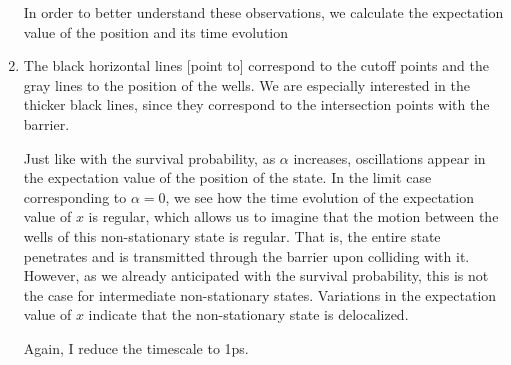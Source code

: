 \documentclass[12pt, a4paper]{article}
\begin{document}
\begin{enumerate}[label=\textbf{Slide \arabic*.}]
        In order to better understand these observations, we calculate the expectation value of the position and its time evolution

    \item The black horizontal lines [point to] correspond to the cutoff points and the gray lines to the position of the wells. We are especially interested in the thicker black lines, since they correspond to the intersection points with the barrier.

        Just like with the survival probability, as $\alpha$ increases, oscillations appear in the expectation value of the position of the state. In the limit case corresponding to $\alpha = 0$, we see how the time evolution of the expectation value of $x$ is regular, which allows us to imagine that the motion between the wells of this non-stationary state is regular. That is, the entire state penetrates and is transmitted through the barrier upon colliding with it. However, as we already anticipated with the survival probability, this is not the case for intermediate non-stationary states. Variations in the expectation value of $x$ indicate that the non-stationary state is delocalized.

        Again, I reduce the timescale to 1ps.


\end{enumerate}
\end{document}
